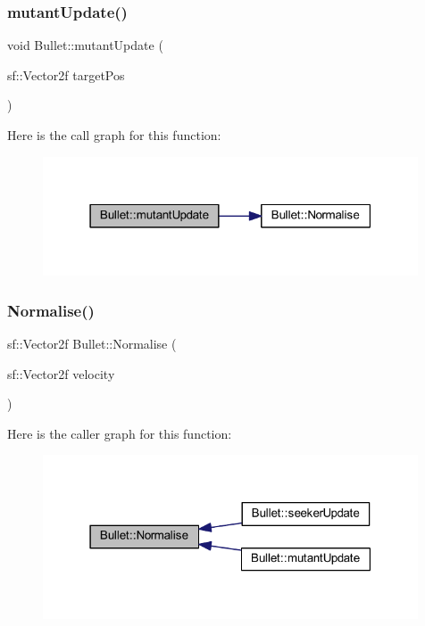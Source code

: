 \mbox{\label{class_bullet_a3af27cff51b293953e03bd4b749b6b8d}} 
\subsubsection{\texorpdfstring{mutant\+Update()}{mutantUpdate()}}
{\footnotesize\ttfamily void Bullet\+::mutant\+Update (\begin{DoxyParamCaption}\item[{sf\+::\+Vector2f}]{target\+Pos }\end{DoxyParamCaption})}

Here is the call graph for this function\+:
\nopagebreak
\begin{figure}[H]
\begin{center}
\leavevmode
\includegraphics[width=315pt]{class_bullet_a3af27cff51b293953e03bd4b749b6b8d_cgraph}
\end{center}
\end{figure}
\mbox{\label{class_bullet_a77e05d1fe031b205bfcfa388b13820c4}} 
\subsubsection{\texorpdfstring{Normalise()}{Normalise()}}
{\footnotesize\ttfamily sf\+::\+Vector2f Bullet\+::\+Normalise (\begin{DoxyParamCaption}\item[{sf\+::\+Vector2f}]{velocity }\end{DoxyParamCaption})}

Here is the caller graph for this function\+:
\nopagebreak
\begin{figure}[H]
\begin{center}
\leavevmode
\includegraphics[width=315pt]{class_bullet_a77e05d1fe031b205bfcfa388b13820c4_icgraph}
\end{center}
\end{figure}
\mbox{\label{class_bullet_add6e90fd23ded0a93ceaa2d489060591}} 
